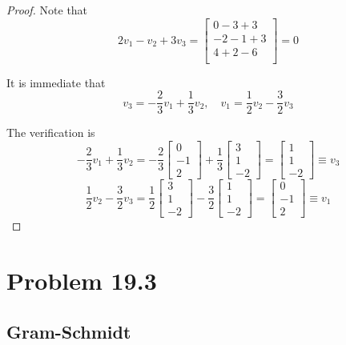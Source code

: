 \documentclass{article}
\theoremstyle{named}
\begin{document}
\begin{proof}
Note that 
\[
    2v_1 - v_2 + 3v_3 = 
    \begin{bmatrix}
        0 - 3 + 3 \\
        -2 - 1 + 3 \\
        4 + 2 - 6 \\
    \end{bmatrix} = 0
\]

It is immediate that
\[
    v_3 = -\frac{2}{3}v_1 + \frac{1}{3}v_2,\quad v_1 = \frac{1}{2}v_2 - \frac{3}{2}v_3
\]

The verification is
\[
    -\frac{2}{3}v_1 + \frac{1}{3}v_2 = -\frac{2}{3} \begin{bmatrix} 0 \\ -1 \\ 2 \end{bmatrix} + \frac{1}{3} \begin{bmatrix} 3 \\ 1 \\ -2 \end{bmatrix} = \begin{bmatrix} 1 \\ 1 \\ -2 \end{bmatrix} \equiv v_3
\]
\[
    \frac{1}{2}v_2 - \frac{3}{2}v_3 = \frac{1}{2} \begin{bmatrix} 3 \\ 1 \\ -2 \end{bmatrix} - \frac{3}{2} \begin{bmatrix} 1 \\ 1\\ -2 \end{bmatrix} = \begin{bmatrix} 0 \\ -1 \\ 2 \end{bmatrix} \equiv v_1 
\]
\end{proof}

\section{Problem 19.3}

\subsection{Gram-Schmidt}
\end{document}
